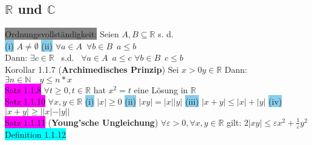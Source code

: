 \documentclass[landscape, 10pt]{article}
\newcommand{\R}{\mathbb{R}}
\newcommand{\N}{\mathbb{N}}
\newcommand{\C}{\mathbb{C}}
\begin{document}
\pagestyle{fancy}
\fancyhf{}
\cfoot{\thepage}

\begin{multicols}{3}
\section{$\R$ und $\C$}
              \colorbox{gray}{Ordnungsvollständigkeit:}
                     Seien $A, B\subseteq\R$ s. d.\\
                     \indent\colorbox{SkyBlue}{(i)} 
                            $A\neq\emptyset$
                     \quad\colorbox{SkyBlue}{(ii)} 
                            $\forall a\in A \enspace \forall b 
                            \in B \enspace a \leqslant b$ \\
                     \indent Dann: $\exists c\in\R\enspace$ s.d. 
                     $\enspace\forall a\in A\enspace a\leqslant c$
                     $\forall b\in B\enspace c\leqslant b$\\
              \colorbox{BurntOrange}{Korollar 1.1.7} 
              (\textbf{Archimedisches Prinzip}) 
                     Sei \textcolor{NavyBlue}{$x>0 y\in\R$}
                     \quad Dann: \textcolor{NavyBlue}{
                     $\exists n\in \N \quad y\leqslant n*x$}\\
              \colorbox{magenta}{Satz 1.1.8} \textcolor{NavyBlue}{
                     $\forall t\geqslant 0, t\in\R$} hat \textcolor{NavyBlue}{$x^2=t$} 
                     eine Lösung in $\R$\\
              \colorbox{magenta}{Satz 1.1.10} $\forall x,y\in\R$ 
                     \colorbox{SkyBlue}{(i)} $|x|\geqslant 0$ \quad\colorbox{SkyBlue}{(ii)} 
                     $|xy|=|x||y|$ \quad
                     \colorbox{SkyBlue}{(iii)} $|x+y|\leqslant |x|+|y|$
                     \quad\colorbox{SkyBlue}{(iv)} $|x+y|\geqslant ||x|-|y||$\\
              \colorbox{magenta}{Satz 1.1.11}
              (\textbf{Young'sche Ungleichung})
                     \textcolor{NavyBlue}{
                     $\forall\varepsilon >0, \forall x,y\in\R$} 
                     gilt: \qquad \textcolor{NavyBlue}{
                     $2|xy|\leqslant\varepsilon x^2+\frac{1}{\varepsilon}y^2$}\\
              \colorbox{cyan}{Definition 1.1.12} 

\end{multicols}
\end{document}
